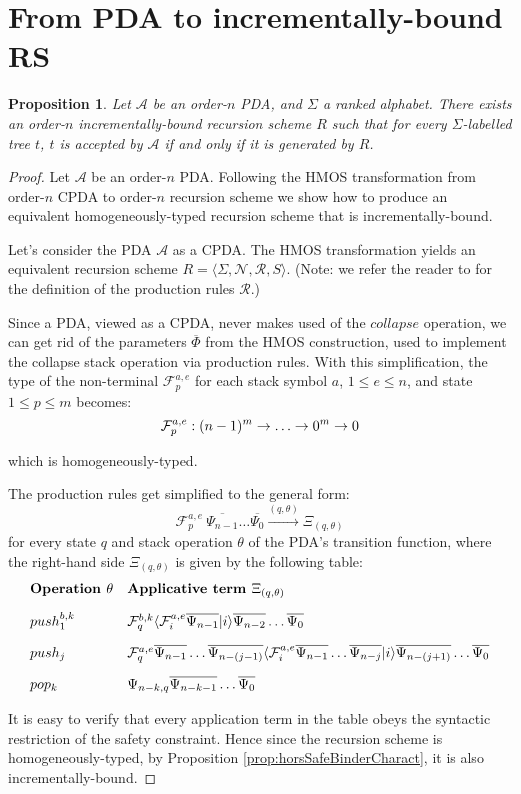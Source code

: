 \documentclass[a4paper]{article}[12pt]
\newtheorem{proposition}{Proposition}[section]
\theoremstyle{remark}
\theoremstyle{definition}
\begin{document}
\section{From PDA to incrementally-bound RS}
\label{sec:PDAtoIncrementallyBoundRS}
\begin{proposition}
	Let $\mathcal{A}$ be an order-$n$ PDA, and $\Sigma$ a ranked alphabet. There exists an order-$n$ incrementally-bound recursion scheme $R$
	such that for every $\Sigma$-labelled tree $t$, $t$ is accepted by $\mathcal{A}$ if and only if it is generated by $R$.
\end{proposition}
\begin{proof}
Let $\mathcal{A}$ be an order-$n$ PDA. Following the HMOS transformation from order-$n$ CPDA to order-$n$ recursion scheme \cite{hmos-lics08} we show how to produce an equivalent homogeneously-typed recursion scheme that is incrementally-bound.

Let's consider the PDA $\mathcal{A}$ as a CPDA. The HMOS transformation yields an equivalent recursion scheme
$R = \langle \Sigma, \mathcal{N}, \mathcal{R}, S \rangle$.
(Note: we refer the reader to \cite{hmos-lics08} for the definition of the production rules
$\mathcal{R}$.)

Since a PDA, viewed as a CPDA, never makes used of the $collapse$ operation, we can get rid of the parameters $\overline\Phi$ from the
HMOS construction, used to implement the collapse stack operation via production rules.
With this simplification, the type of the non-terminal $\mathcal{F}_p^{a,e}$  for each stack symbol $a$, $1\leq e \leq n$, and state $1\leq p \leq m$  becomes:
 $$ \mathcal{F}_p^{a,e} : (n-1)^m \rightarrow \ldots \rightarrow 0^m \rightarrow 0$$

which is homogeneously-typed.

The production rules get simplified to the general form:
 $$ \mathcal{F}_p^{a,e} \  \overline{\Psi_{n-1}} \ldots \overline{\Psi_0} \stackrel{(q,\theta)}\rightarrow \Xi_{(q,\theta)}$$
for every state $q$ and stack operation $\theta$ of the PDA's transition function,
where the right-hand side $\Xi_{(q,\theta)}$ is given by the following table:
$$\begin{array}{ll}
\mbox{\bf Operation $\theta$} & \mbox{\bf Applicative term } \Xi_{(q,\theta)} \\[10pt]
push_1^{b,k} & \mathcal{F}_q^{b,k} \langle \mathcal{F}_i^{a,e} \overline{\Psi_{n-1}} | i \rangle \overline{\Psi_{n-2}} \ldots
 \overline{\Psi_0} \\[10pt]
push_j & \mathcal{F}_q^{a,e} \overline{\Psi_{n-1}} \ldots \overline{\Psi_{n-(j-1)}}\langle \mathcal{F}_i^{a,e} \overline{\Psi_{n-1}} \ldots \overline{\Psi_{n-j}} | i \rangle \overline{\Psi_{n-(j+1)}} \ldots
 \overline{\Psi_0} \\[10pt]
pop_k & \Psi_{n-k,q} \overline{\Psi_{n-k-1}} \ldots \overline{\Psi_{0}}
 \end{array}
 $$

It is easy to verify that every application term in the table obeys the syntactic restriction of the safety constraint.
Hence since the recursion scheme is homogeneously-typed, by Proposition \ref{prop:horsSafeBinderCharact}, it is also incrementally-bound.
\end{proof}



\end{document}

